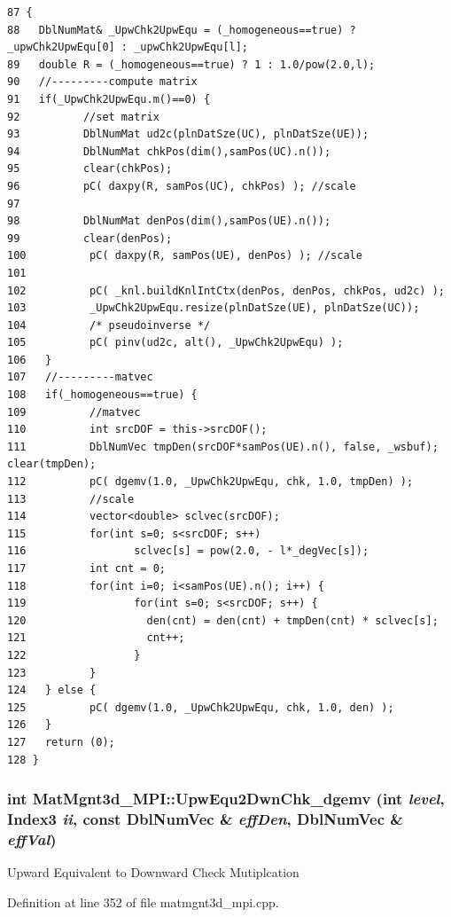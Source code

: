 \footnotesize\begin{verbatim}87 {
88   DblNumMat& _UpwChk2UpwEqu = (_homogeneous==true) ? _upwChk2UpwEqu[0] : _upwChk2UpwEqu[l];
89   double R = (_homogeneous==true) ? 1 : 1.0/pow(2.0,l);
90   //---------compute matrix
91   if(_UpwChk2UpwEqu.m()==0) {   
92          //set matrix
93          DblNumMat ud2c(plnDatSze(UC), plnDatSze(UE));
94          DblNumMat chkPos(dim(),samPos(UC).n());
95          clear(chkPos);
96          pC( daxpy(R, samPos(UC), chkPos) ); //scale
97 
98          DblNumMat denPos(dim(),samPos(UE).n());
99          clear(denPos);
100          pC( daxpy(R, samPos(UE), denPos) ); //scale
101          
102          pC( _knl.buildKnlIntCtx(denPos, denPos, chkPos, ud2c) );
103          _UpwChk2UpwEqu.resize(plnDatSze(UE), plnDatSze(UC));
104          /* pseudoinverse */
105          pC( pinv(ud2c, alt(), _UpwChk2UpwEqu) );
106   }
107   //---------matvec
108   if(_homogeneous==true) {
109          //matvec
110          int srcDOF = this->srcDOF();
111          DblNumVec tmpDen(srcDOF*samPos(UE).n(), false, _wsbuf);         clear(tmpDen);
112          pC( dgemv(1.0, _UpwChk2UpwEqu, chk, 1.0, tmpDen) );
113          //scale
114          vector<double> sclvec(srcDOF);
115          for(int s=0; s<srcDOF; s++)
116                 sclvec[s] = pow(2.0, - l*_degVec[s]);
117          int cnt = 0;
118          for(int i=0; i<samPos(UE).n(); i++) {
119                 for(int s=0; s<srcDOF; s++) {
120                   den(cnt) = den(cnt) + tmpDen(cnt) * sclvec[s];
121                   cnt++;
122                 }
123          }
124   } else {
125          pC( dgemv(1.0, _UpwChk2UpwEqu, chk, 1.0, den) );
126   }
127   return (0);
128 }
\end{verbatim}\normalsize 


\subsubsection{\setlength{\rightskip}{0pt plus 5cm}int Mat\-Mgnt3d\_\-MPI::Upw\-Equ2Dwn\-Chk\_\-dgemv (int {\em level}, Index3 {\em ii}, const Dbl\-Num\-Vec \& {\em eff\-Den}, Dbl\-Num\-Vec \& {\em eff\-Val})}\label{classMatMgnt3d__MPI_265501b782aca2ac9f06197ab087e319_265501b782aca2ac9f06197ab087e319}


Upward Equivalent to Downward Check Mutiplcation 

Definition at line 352 of file matmgnt3d\_\-mpi.cpp.

